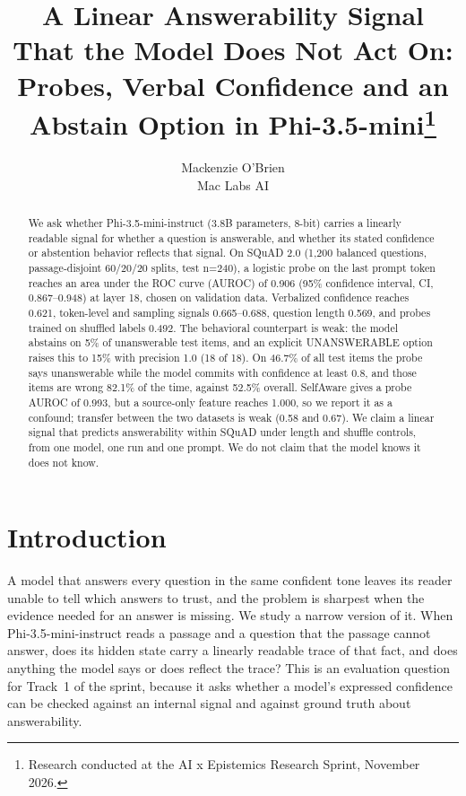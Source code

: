 \documentclass[10pt]{article}
\title{\vspace{-1.2em}A Linear Answerability Signal That the Model Does Not Act On:\\Probes, Verbal Confidence and an Abstain Option in Phi-3.5-mini\thanks{Research conducted at the AI x Epistemics Research Sprint, November 2026.}}
\author{Mackenzie O'Brien\\ Mac Labs AI}
\date{}
\begin{document}
\maketitle
\vspace{-2.2em}

\begin{abstract}
\noindent
We ask whether Phi-3.5-mini-instruct (3.8B parameters, 8-bit) carries a linearly readable signal for whether a question is answerable, and whether its stated confidence or abstention behavior reflects that signal. On SQuAD 2.0 (1,200 balanced questions, passage-disjoint 60/20/20 splits, test n=240), a logistic probe on the last prompt token reaches an area under the ROC curve (AUROC) of 0.906 (95\% confidence interval, CI, 0.867--0.948) at layer 18, chosen on validation data. Verbalized confidence reaches 0.621, token-level and sampling signals 0.665--0.688, question length 0.569, and probes trained on shuffled labels 0.492. The behavioral counterpart is weak: the model abstains on 5\% of unanswerable test items, and an explicit UNANSWERABLE option raises this to 15\% with precision 1.0 (18 of 18). On 46.7\% of all test items the probe says unanswerable while the model commits with confidence at least 0.8, and those items are wrong 82.1\% of the time, against 52.5\% overall. SelfAware gives a probe AUROC of 0.993, but a source-only feature reaches 1.000, so we report it as a confound; transfer between the two datasets is weak (0.58 and 0.67). We claim a linear signal that predicts answerability within SQuAD under length and shuffle controls, from one model, one run and one prompt. We do not claim that the model knows it does not know.
\end{abstract}

\section{Introduction}
A model that answers every question in the same confident tone leaves its reader unable to tell which answers to trust, and the problem is sharpest when the evidence needed for an answer is missing. We study a narrow version of it. When Phi-3.5-mini-instruct \citep{abdin2024phi3} reads a passage and a question that the passage cannot answer, does its hidden state carry a linearly readable trace of that fact, and does anything the model says or does reflect the trace? This is an evaluation question for Track~1 of the sprint, because it asks whether a model's expressed confidence can be checked against an internal signal and against ground truth about answerability.
\end{document}
